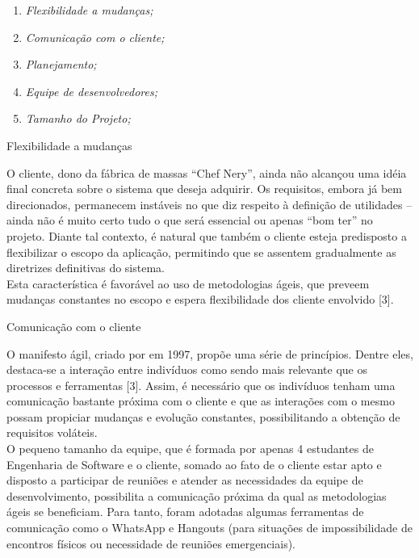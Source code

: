 \begin{enumerate}
	\item \textsl{Flexibilidade a mudanças;}
	\item \textsl{Comunicação com o cliente;}
	\item \textsl{Planejamento;}
	\item \textsl{Equipe de desenvolvedores;}
	\item \textsl{Tamanho do Projeto;}
\end{enumerate}


{
	\large{Flexibilidade a mudanças\\}

	\tab O cliente, dono da fábrica de massas “Chef Nery”, ainda não alcançou uma idéia final concreta sobre o sistema que deseja adquirir. Os requisitos, embora já bem direcionados, permanecem instáveis no que diz respeito à definição de utilidades – ainda não é muito certo tudo o que será essencial ou apenas “bom ter” no projeto. Diante tal contexto, é natural que também o cliente esteja predisposto a flexibilizar o escopo da aplicação, permitindo que se assentem gradualmente as diretrizes definitivas do sistema. \\
	\tab Esta característica é favorável ao uso de metodologias ágeis, que preveem mudanças constantes no escopo e espera flexibilidade dos cliente envolvido [3]. \\
}

{
	\large{Comunicação com o cliente\\}

	\tab O manifesto ágil, criado por  em 1997, propõe uma série de princípios. Dentre eles, destaca-se a interação entre indivíduos como sendo mais relevante que os processos e ferramentas  [3]. Assim,  é necessário que os indivíduos tenham uma comunicação bastante próxima  com o cliente e que as interações com o mesmo possam propiciar mudanças e evolução constantes, possibilitando  a obtenção de requisitos voláteis. \\
	\tab O pequeno tamanho da equipe, que é formada por apenas 4 estudantes de Engenharia de Software e o cliente, somado ao fato de o cliente estar apto e disposto a participar de reuniões e atender as necessidades da equipe de desenvolvimento, possibilita a comunicação próxima da qual as metodologias ágeis se beneficiam. Para tanto, foram adotadas algumas ferramentas de comunicação como o WhatsApp e Hangouts (para situações de impossibilidade de encontros físicos ou necessidade de reuniões emergenciais). \\

}

